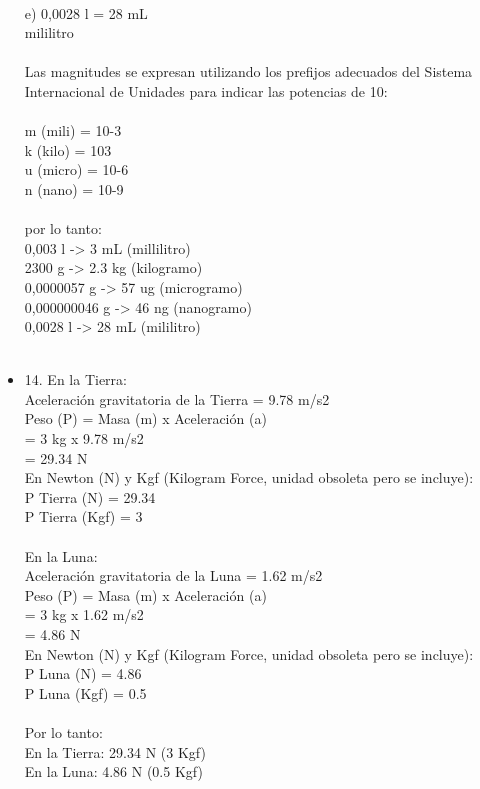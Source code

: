 \documentclass{article}
\begin{document}
\begin{itemize}
\\
e) 0,0028 l = 28 mL\\
mililitro\\
\\
Las magnitudes se expresan utilizando los prefijos adecuados del Sistema Internacional de Unidades para indicar las potencias de 10:\\
\\
m (mili) = 10-3\\
k (kilo) = 103\\
u (micro) = 10-6\\
n (nano) = 10-9\\
\\
por lo tanto:\\
0,003 l -> 3 mL (millilitro)\\
2300 g -> 2.3 kg (kilogramo)\\
0,0000057 g -> 57 ug (microgramo)\\
0,000000046 g -> 46 ng (nanogramo)\\
0,0028 l -> 28 mL (mililitro)\\
\\
\item{14.}
En la Tierra:\\
Aceleración gravitatoria de la Tierra = 9.78 m/s2\\
Peso (P) = Masa (m) x Aceleración (a)\\
= 3 kg x 9.78 m/s2\\
= 29.34 N\\
En Newton (N) y Kgf (Kilogram Force, unidad obsoleta pero se incluye):\\
P Tierra (N) = 29.34\\
P Tierra (Kgf) = 3\\
\\
En la Luna:\\
Aceleración gravitatoria de la Luna = 1.62 m/s2\\
Peso (P) = Masa (m) x Aceleración (a)\\
= 3 kg x 1.62 m/s2\\
= 4.86 N\\
En Newton (N) y Kgf (Kilogram Force, unidad obsoleta pero se incluye):\\
P Luna (N) = 4.86\\
P Luna (Kgf) = 0.5\\
\\
Por lo tanto:\\
En la Tierra: 29.34 N (3 Kgf)\\
En la Luna: 4.86 N (0.5 Kgf)\\

\end{itemize}
\end{document}
